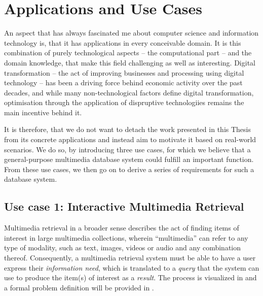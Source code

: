 \chapter{Applications and Use Cases}
\label{chapter:applications}

An aspect that has always fascinated me about computer science and information technology is, that it has applications in every conceivable domain. It is this combination of purely technological aspects -- the computational part -- and the domain knowledge, that make this field challenging as well as interesting. Digital transformation -- the act of improving businesses and processing using digital technology \cite{Vial:2019Understanding} -- has been a driving force behind economic activity over the past decades, and while many non-technological factors define digital transformation, optimisation through the application of dispruptive technologiies remains the main incentive behind it.

It is therefore, that we do not want to detach the work presented in this Thesis from its concrete applications and instead aim to motivate it based on real-world scenarios. We do so, by introducing three use cases, for which we believe that a general-purpose multimedia database system could fulfill an important function. From these use cases, we then go on to derive a series of requirements for such a database system.

\section{Use case 1: Interactive Multimedia Retrieval}
\label{section:application_retrieval}

Multimedia retrieval in a broader sense describes the act of finding items of interest in large multimedia collections, wherein ``multimedia'' can refer to any type of modality, such as text, images, videos or audio and any combination thereof. Consequently, a multimedia retrieval system must be able to have a user express their \emph{information need}, which is translated to a \emph{query} that the system can use to produce the item(s) of interest as a \emph{result}. The process is visualized in  and a formal problem definition will be provided in .

